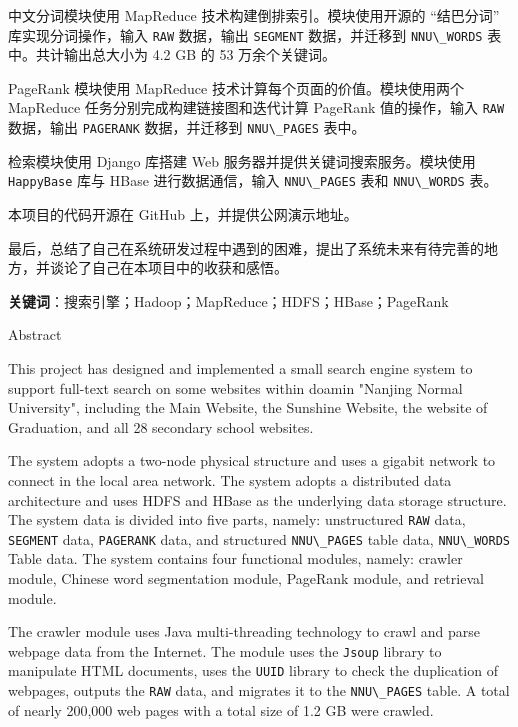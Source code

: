 \documentclass{ctexart}
\newcommand{\code}[1]{\colorbox{backcolor}{\lstinline|#1|}}
\begin{document}
    中文分词模块使用 MapReduce 技术构建倒排索引。模块使用开源的 “结巴分词” 库实现分词操作，输入 \code{RAW} 数据，输出 \code{SEGMENT} 数据，并迁移到 \code{NNU\_WORDS} 表中。共计输出总大小为 4.2 GB 的 53 万余个关键词。

    PageRank 模块使用 MapReduce 技术计算每个页面的价值。模块使用两个 MapReduce 任务分别完成构建链接图和迭代计算 PageRank 值的操作，输入 \code{RAW} 数据，输出 \code{PAGERANK} 数据，并迁移到 \code{NNU\_PAGES} 表中。

    检索模块使用 Django 库搭建 Web 服务器并提供关键词搜索服务。模块使用 \code{HappyBase} 库与 HBase 进行数据通信，输入 \code{NNU\_PAGES} 表和 \code{NNU\_WORDS} 表。

    本项目的代码开源在 GitHub 上，并提供公网演示地址。

    最后，总结了自己在系统研发过程中遇到的困难，提出了系统未来有待完善的地方，并谈论了自己在本项目中的收获和感悟。

    \textbf{关键词}：搜索引擎；Hadoop；MapReduce；HDFS；HBase；PageRank

    \newpage

    \thispagestyle{abstract-en}

    \begin{center}
        \LARGE Abstract
    \end{center}

    This project has designed and implemented a small search engine system to support full-text search on some websites within doamin "Nanjing Normal University", including the Main Website, the Sunshine Website, the website of Graduation, and all 28 secondary school websites.

    The system adopts a two-node physical structure and uses a gigabit network to connect in the local area network. The system adopts a distributed data architecture and uses HDFS and HBase as the underlying data storage structure. The system data is divided into five parts, namely: unstructured \code{RAW} data, \code{SEGMENT} data, \code{PAGERANK} data, and structured \code{NNU\_PAGES} table data, \code{NNU\_WORDS} Table data. The system contains four functional modules, namely: crawler module, Chinese word segmentation module, PageRank module, and retrieval module.

    The crawler module uses Java multi-threading technology to crawl and parse webpage data from the Internet. The module uses the \code{Jsoup} library to manipulate HTML documents, uses the \code{UUID} library to check the duplication of webpages, outputs the \code{RAW} data, and migrates it to the \code{NNU\_PAGES} table. A total of nearly 200,000 web pages with a total size of 1.2 GB were crawled.
\end{document}
